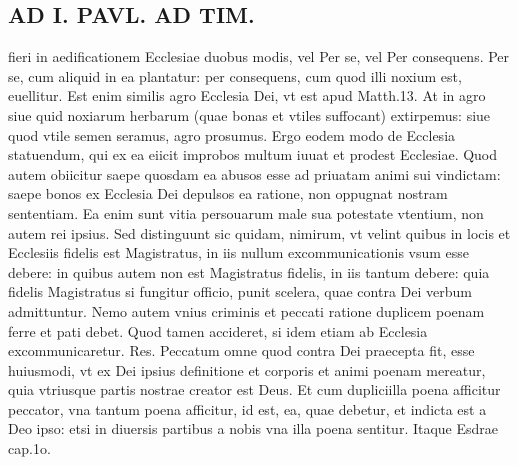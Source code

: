\documentclass{article}
\begin{document}
\begin{pages}
\section*{AD I. PAVL. AD TIM. }
\marginpar{[ p.30 ]}\pstart fieri in aedificationem Ecclesiae duobus modis, vel Per se, vel Per consequens. Per se, cum aliquid in ea plantatur: per consequens, cum quod illi noxium est, euellitur. Est enim similis agro Ecclesia Dei, vt est apud Matth.13. At in agro siue quid noxiarum herbarum (quae bonas et vtiles suffocant) extirpemus: siue quod vtile semen seramus, agro prosumus. Ergo eodem modo de Ecclesia statuendum, qui ex ea eiicit improbos multum iuuat et prodest Ecclesiae. Quod autem obiicitur saepe quosdam ea abusos esse ad priuatam animi sui vindictam: saepe bonos ex Ecclesia Dei depulsos ea ratione, non oppugnat nostram sententiam. Ea enim sunt vitia persouarum male sua potestate vtentium, non autem rei ipsius. Sed distinguunt sic quidam, nimirum, vt velint quibus in locis et Ecclesiis fidelis est Magistratus, in iis nullum excommunicationis vsum esse debere: in quibus autem non est Magistratus fidelis, in iis tantum debere: quia fidelis Magistratus si fungitur officio, punit scelera, quae contra Dei verbum admittuntur. Nemo autem vnius criminis et peccati ratione duplicem poenam ferre et pati debet. Quod tamen accideret, si idem etiam ab Ecclesia excommunicaretur. Res. Peccatum omne quod contra Dei praecepta fit, esse huiusmodi, vt ex Dei ipsius definitione et corporis et animi poenam mereatur, quia vtriusque partis nostrae creator est Deus. Et cum dupliciilla poena afficitur peccator, vna tantum poena afficitur, id est, ea, quae debetur, et indicta est a Deo ipso: etsi in diuersis partibus a nobis vna illa poena sentitur. Itaque Esdrae cap.1o.  \pend

\end{pages}
\end{document}
